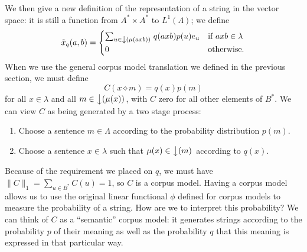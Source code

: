 
We then give a new definition of the representation of a string in the vector space: it is still a function from $A^*\times A^*$ to $L^1(\Lambda)$; we define
$$\tilde{x}_q(a,b) = \begin{cases}
\sum_{u \in \left\downarrow(\mu(axb))\right.} q(axb)p(u)e_u & \text{if $axb \in \lambda$}\\
0 & \text{otherwise.}
\end{cases}$$
When we use the general corpus model translation we defined in the previous section, we must define
$$C(x\diamond m) = q(x)p(m)$$
for all $x \in \lambda$ and all $m \in \left\downarrow(\mu(x))\right.$, with $C$ zero for all other elements of $B^*$. We can view $C$ as being generated by a two stage process:
\begin{enumerate}
\item Choose a sentence $m\in\Lambda$ according to the probability distribution $p(m)$.
\item Choose a sentence $x\in\lambda$ such that $\mu(x) \in \left\downarrow(m)\right.$ according to $q(x)$.
\end{enumerate}
Because of the requirement we placed on $q$, we must have $\|C\|_1 = \sum_{u \in B^*} C(u) = 1$, so $C$ is a corpus model. Having a corpus model allows us to use the original linear functional $\phi$ defined for corpus models to measure the probability of a string. How are we to interpret this probability? We can think of $C$ as a ``semantic'' corpus model: it generates strings according to the probability $p$ of their meaning as well as the probability $q$ that this meaning is expressed in that particular way.






